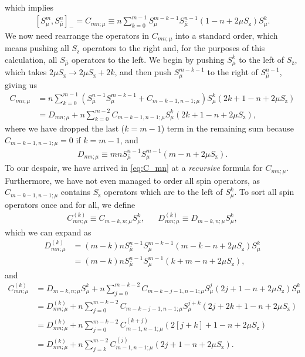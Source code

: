\documentclass[pra,reprint,longbibliography]{revtex4-1}
\newcommand{\p}[1]{\left(#1\right)} %
\renewcommand{\sp}[1]{\left[#1\right]} %
\newcommand{\z}{\text{z}}
\newcommand{\bmu}{{\bar\mu}}
\newcommand{\1}{\mathds{1}}
\begin{document}
which implies
\begin{align}
  \sp{S_\mu^m, S_\bmu^n}_-
  = C_{mn;\mu}
  \equiv n \sum_{k=0}^{m-1} S_\mu^{m-k-1} S_\bmu^{n-1}
  \p{1 - n + 2\mu S_\z} S_\mu^k.
\end{align}
We now need rearrange the operators in $C_{mn;\mu}$ into a standard
order, which means pushing all $S_\z$ operators to the right and, for
the purposes of this calculation, all $S_\bmu$ operators to the left.
We begin by pushing $S_\mu^k$ to the left of $S_\z$, which takes
$2\mu S_\z\to 2\mu S_\z+2k$, and then push $S_\mu^{m-k-1}$ to the
right of $S_\bmu^{n-1}$, giving us
\begin{align}
  C_{mn;\mu}
  &= n \sum_{k=0}^{m-1}
  \p{S_\bmu^{n-1} S_\mu^{m-k-1} + C_{m-k-1,n-1;\mu}} S_\mu^k
  \p{2k + 1 - n + 2\mu S_\z} \\
  &= D_{mn;\mu}
  + n \sum_{k=0}^{m-2} C_{m-k-1,n-1;\mu}
  S_\mu^k \p{2k + 1 - n + 2\mu S_\z},
  \label{eq:C_mn}
\end{align}
where we have dropped the last ($k=m-1$) term in the remaining sum
because $C_{m-k-1,n-1;\mu}=0$ if $k=m-1$, and
\begin{align}
  D_{mn;\mu}
  \equiv mn S_\bmu^{n-1} S_\mu^{m-1} \p{m - n + 2\mu S_\z}.
  \label{eq:D_mn}
\end{align}
To our despair, we have arrived in \eqref{eq:C_mn} at a {\it
  recursive} formula for $C_{mn;\mu}$.  Furthermore, we have not even
managed to order all spin operators, as $C_{m-k-1,n-1;\mu}$ contains
$S_\z$ operators which are to the left of $S_\mu^k$.  To sort all spin
operators once and for all, we define
\begin{align}
  C_{mn;\mu}^{(k)} \equiv C_{m-k,n;\mu} S_\mu^k,
  &&
  D_{mn;\mu}^{(k)} \equiv D_{m-k,n;\mu} S_\mu^k,
\end{align}
which we can expand as
\begin{align}
  D_{mn;\mu}^{(k)}
  &= \p{m-k}n S_\bmu^{n-1} S_\mu^{m-k-1}
  \p{m-k-n+2\mu S_\z} S_\mu^k \\
  &= \p{m-k}n S_\bmu^{n-1} S_\mu^{m-1} \p{k+m-n+2\mu S_\z},
  \label{eq:D_mn_k}
\end{align}
and
\begin{align}
  C_{mn;\mu}^{(k)}
  &= D_{m-k,n;\mu} S_\mu^k + n \sum_{j=0}^{m-k-2}
  C_{m-k-j-1,n-1;\mu} S_\mu^j \p{2j+1-n+2\mu S_\z} S_\mu^k \\
  &= D_{mn;\mu}^{(k)} + n \sum_{j=0}^{m-k-2}
  C_{m-k-j-1,n-1;\mu} S_\mu^{j+k} \p{2j+2k+1-n+2\mu S_\z} \\
  &= D_{mn;\mu}^{(k)} + n \sum_{j=0}^{m-k-2}
  C_{m-1,n-1;\mu}^{(k+j)} \p{2\sp{j+k}+1-n+2\mu S_\z} \\
  &= D_{mn;\mu}^{(k)} + n \sum_{j=k}^{m-2}
  C_{m-1,n-1;\mu}^{(j)} \p{2j+1-n+2\mu S_\z}.
  \label{eq:C_mn_k}
\end{align}
\end{document}
